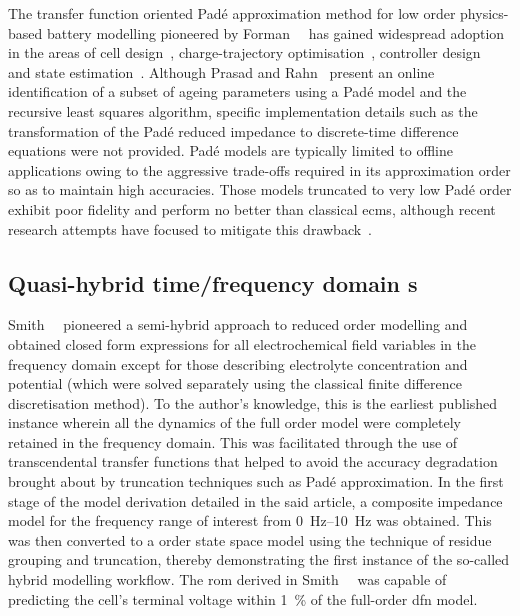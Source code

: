 The     transfer     function     oriented     Padé     approximation     method
for    low    order    physics-based     battery    modelling    pioneered    by
Forman~\etal{}~\cite{Forman2011a}    has   gained    widespread   adoption    in
the    areas     of    cell     design~\cite{Marcicki2013},    charge-trajectory
optimisation~\cite{Bashash2010},    controller    design~\cite{Perez2015}    and
state    estimation~\cite{Marcicki2013,Moura2012}.     Although    Prasad    and
Rahn~\cite{Prasad2013} present  an online identification  of a subset  of ageing
parameters  using  a Padé  model  and  the  recursive least  squares  algorithm,
specific implementation details  such as the transformation of  the Padé reduced
impedance to discrete-time  difference equations were not  provided. Padé models
are typically limited to offline applications owing to the aggressive trade-offs
required in  its approximation order  so as  to maintain high  accuracies. Those
models truncated  to very low  Padé order exhibit  poor fidelity and  perform no
better  than  classical  \glspl{ecm},  although recent  research  attempts  have
focused to mitigate this drawback~\cite{Yuan2017a,Yuan2017}.


\subsection{Quasi-hybrid time/frequency domain s}

Smith~\etal{}~\cite{Smith2007} pioneered a semi-hybrid approach to reduced order
modelling and  obtained closed  form expressions  for all  electrochemical field
variables  in  the frequency  domain  except  for those  describing  electrolyte
concentration and  potential (which were  solved separately using  the classical
finite  difference  discretisation  method).  To the  author's  knowledge,  this
is  the  earliest published  instance  wherein  all  the  dynamics of  the  full
order  model  were  completely  retained  in  the  frequency  domain.  This  was
facilitated through  the use  of transcendental  transfer functions  that helped
to  avoid  the  accuracy  degradation brought  about  by  truncation  techniques
such  as  Padé  approximation.  In  the first  stage  of  the  model  derivation
detailed in  the said  article, a  composite impedance  model for  the frequency
range  of interest  from  \SIrange{0}{10}{\hertz} was  obtained.  This was  then
converted to a  order state  space model using the technique of
residue  grouping  and  truncation,  thereby demonstrating  the  first  instance
of  the   so-called  hybrid  modelling   workflow.  The  \gls{rom}   derived  in
Smith~\etal{}~\cite{Smith2007}  was capable  of predicting  the cell's  terminal
voltage within \SI{1}{\percent} of the full-order \gls{dfn} model.

